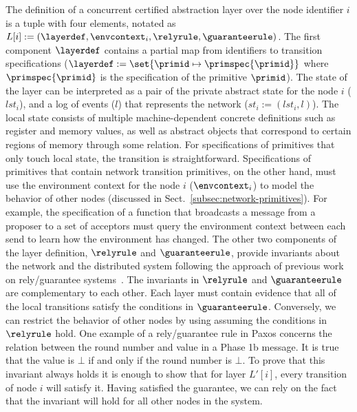 
The definition of a concurrent certified abstraction layer over the node identifier $i$
is a tuple with four elements, notated as $L[i] := (\layerdef, \envcontext_i, \relyrule, \guaranteerule)$.
The first component $\layerdef$ contains a partial map from
identifiers to transition specifications
($\layerdef := \set{\primid \mapsto \primspec{\primid}}$ where $ \primspec{\primid}$ is
the specification of the primitive $\primid$).
The state of the layer can be interpreted as a pair
of the private abstract state for the node $i$ ($lst_i$), and
a log of events ($l$) that represents the network ($st_i := (lst_i, l)$).
The local state consists of multiple machine-dependent concrete definitions such as register and memory values,
as well as abstract objects that correspond to
certain regions of memory through some relation.
For specifications of primitives that only touch local state, the transition is straightforward.
Specifications of primitives that contain network transition primitives, on the other hand,
must use the environment context for the node $i$ ($\envcontext_i$)
to model the behavior of other nodes (discussed in Sect.~\ref{subsec:network-primitives}).
For example, the specification of a function that broadcasts a message from a proposer to a set of acceptors must query the environment context
between each send to learn how the environment has changed.
The other two components of the layer definition, $\relyrule$ and $\guaranteerule$,
provide invariants about the network and the distributed system
following the approach of previous work on rely/guarantee systems~\cite{RGSim, LRG}.
The invariants in $\relyrule$ and $\guaranteerule$ are complementary to each other.
Each layer must contain evidence that all of the local transitions satisfy the conditions in $\guaranteerule$.
Conversely, we can restrict the behavior of other nodes by using assuming the conditions in $\relyrule$ hold.
One example of a rely/guarantee rule in Paxos concerns the relation between the round number and value in a Phase 1b message.
It is true that the value is $\bot$ if and only if the round number is $\bot$.
To prove that this invariant always holds it is enough to show that
for layer $L'[i]$, every transition of node $i$ will satisfy it.
Having satisfied the guarantee, we can rely on the fact that the invariant will hold for all other nodes in the system.


